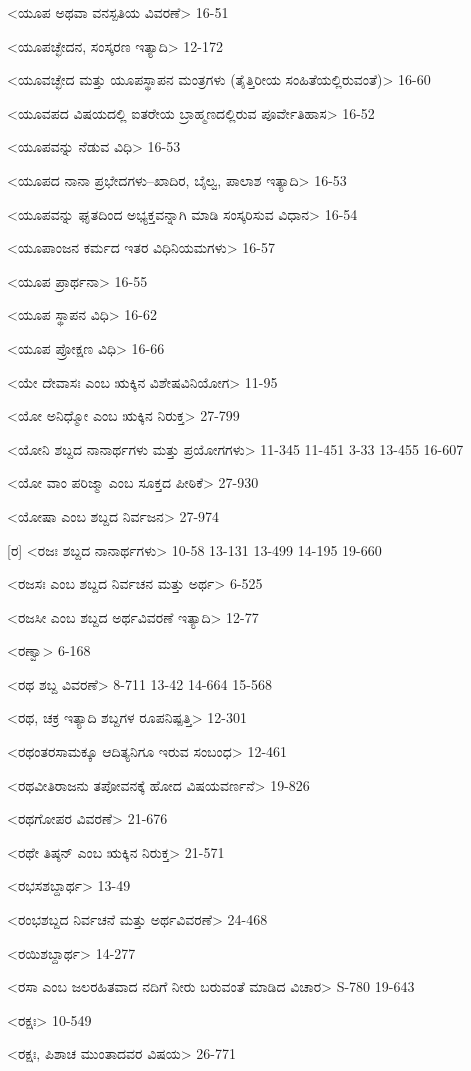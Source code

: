 <ಯೂಪ ಅಥವಾ ವನಸ್ಪತಿಯ ವಿವರಣೆ>
16-51

<ಯೂಪಚ್ಛೇದನ, ಸಂಸ್ಕರಣ ಇತ್ಯಾದಿ>
12-172

<ಯೂವಚ್ಛೇದ ಮತ್ತು ಯೂಪಸ್ಥಾಪನ ಮಂತ್ರಗಳು (ತೈತ್ತಿರೀಯ ಸಂಹಿತೆಯಲ್ಲಿರುವಂತೆ)>
16-60

<ಯೂವಪದ ವಿಷಯದಲ್ಲಿ ಐತರೇಯ ಬ್ರಾಹ್ಮಣದಲ್ಲಿರುವ ಪೂರ್ವೇತಿಹಾಸ>
16-52

<ಯೂಪವನ್ನು ನೆಡುವ ವಿಧಿ>
16-53

<ಯೂಪದ ನಾನಾ ಪ್ರಭೇದಗಳು–ಖಾದಿರ, ಬೈಲ್ವ, ಪಾಲಾಶ ಇತ್ಯಾದಿ>
16-53

<ಯೂಪವನ್ನು ಘೃತದಿಂದ ಅಭ್ಯಕ್ತವನ್ನಾಗಿ ಮಾಡಿ ಸಂಸ್ಕರಿಸುವ ವಿಧಾನ>
16-54

<ಯೂಪಾಂಜನ ಕರ್ಮದ ಇತರ ವಿಧಿನಿಯಮಗಳು>
16-57

<ಯೂಪ ಪ್ರಾರ್ಥನಾ>
16-55

<ಯೂಪ ಸ್ಥಾಪನ ವಿಧಿ>
16-62

<ಯೂಪ ಪ್ರೋಕ್ಷಣ ವಿಧಿ>
16-66

<ಯೇ ದೇವಾಸಃ ಎಂಬ ಋಕ್ಕಿನ ವಿಶೇಷವಿನಿಯೋಗ>
11-95

<ಯೋ ಅನಿಧ್ಮೋ ಎಂಬ ಋಕ್ಕಿನ ನಿರುಕ್ತ>
27-799

<ಯೋನಿ ಶಬ್ದದ ನಾನಾರ್ಥಗಳು ಮತ್ತು ಪ್ರಯೋಗಗಳು>
11-345 
11-451 
3-33 
13-455
16-607

<ಯೋ ವಾಂ ಪರಿಜ್ಮಾ ಎಂಬ ಸೂಕ್ತದ ಪೀಠಿಕೆ>
27-930

<ಯೋಷಾ ಎಂಬ ಶಬ್ದದ ನಿರ್ವಜನ>
27-974

[ರ]
<ರಜಃ ಶಬ್ದದ ನಾನಾರ್ಥಗಳು>
10-58
13-131
13-499 
14-195 
19-660


<ರಜಸಃ ಎಂಬ ಶಬ್ದದ ನಿರ್ವಚನ ಮತ್ತು ಅರ್ಥ>
6-525

<ರಜಸೀ ಎಂಬ ಶಬ್ದದ ಅರ್ಥವಿವರಣೆ ಇತ್ಯಾದಿ>
12-77

<ರಣ್ವಾ>
6-168

<ರಥ ಶಬ್ದ ವಿವರಣೆ>
8-711
13-42
14-664
15-568


<ರಥ, ಚಕ್ರ ಇತ್ಯಾದಿ ಶಬ್ದಗಳ ರೂಪನಿಷ್ಪತ್ತಿ>
12-301


<ರಥಂತರಸಾಮಕ್ಕೂ ಆದಿತ್ಯನಿಗೂ ಇರುವ ಸಂಬಂಧ>
12-461

<ರಥವೀತಿರಾಜನು ತಪೋವನಕ್ಕೆ ಹೋದ ವಿಷಯವರ್ಣನೆ>
19-826

<ರಥಗೋಪರ ವಿವರಣೆ>
21-676

<ರಥೇ ತಿಷ್ಠನ್‍ ಎಂಬ ಋಕ್ಕಿನ ನಿರುಕ್ತ>
21-571

<ರಭಸಶಬ್ದಾರ್ಥ>
13-49

<ರಂಭಶಬ್ದದ ನಿರ್ವಚನೆ ಮತ್ತು ಅರ್ಥವಿವರಣೆ>
24-468

<ರಯಿಶಬ್ದಾರ್ಥ>
14-277

<ರಸಾ ಎಂಬ ಜಲರಹಿತವಾದ ನದಿಗೆ ನೀರು ಬರುವಂತೆ ಮಾಡಿದ ವಿಚಾರ>
S-780 
19-643

<ರಕ್ಷಃ>
10-549

<ರಕ್ಷಃ, ಪಿಶಾಚ ಮುಂತಾದವರ ವಿಷಯ>
26-771

